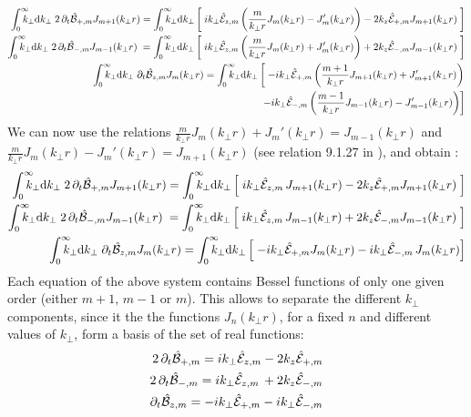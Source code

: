 \begin{align*}
\RInteg{k_\perp } \; 2 \,\partial_t \spectral{B}_{+,m}  J_{m+1}(k_\perp r) =
\RInteg{k_\perp } \left[ \; ik_\perp \spectral{E}_{z,m} \left( \frac{m}{k_\perp r} J_m(k_\perp r) -
    J_m'(k_\perp r) \right) -2 k_z\spectral{E}_{+,m}J_{m+1}(k_\perp r) \;
\right] \\
\RInteg{k_\perp } \; 2\, \partial_t \spectral{B}_{-,m}  J_{m-1}(k_\perp r) \; =
\RInteg{k_\perp } \left[ \;
   ik_\perp \spectral{E}_{z,m} \left( \frac{m}{k_\perp r} J_m(k_\perp r) +
    J_m'(k_\perp r) \right)  + 2k_z\spectral{E}_{-,m}J_{m-1}(k_\perp r) \;
\right] \\
\RInteg{k_\perp }\; \partial_t \spectral{B}_{z,m}  J_{m}(k_\perp r) =
\RInteg{k_\perp } \left[ \; -ik_\perp \spectral{E}_{+,m}\left(\frac{m+1}{k_\perp r}J_{m+1}(k_\perp r) +
    J_{m+1}'(k_\perp r) \right) \right.\\
\qquad \left. - ik_\perp \spectral{E}_{-,m}\left(\frac{m-1}{k_\perp r}J_{m-1}(k_\perp r) -
    J_{m-1}'(k_\perp r) \right) \right] 
\end{align*}
We can now use the relations $\frac{m}{k_\perp r} J_m(k_\perp r) +
    J_m'(k_\perp r) = J_{m-1}(k_\perp r)$ and $\frac{m}{k_\perp r} J_m(k_\perp r) -
    J_m'(k_\perp r) = J_{m+1}(k_\perp r)$ (see relation 9.1.27 in
    \cite{Abramowitz}), and obtain :
\begin{align*}
\RInteg{k_\perp } \; 2 \,\partial_t \spectral{B}_{+,m}  J_{m+1}(k_\perp r) =
\RInteg{k_\perp } \left[ \; ik_\perp \spectral{E}_{z,m}\,
    J_{m+1}(k_\perp r) -2 k_z\spectral{E}_{+,m}J_{m+1}(k_\perp r) \;
\right] \\
\RInteg{k_\perp } \; 2\, \partial_t \spectral{B}_{-,m}  J_{m-1}(k_\perp r) \; =
\RInteg{k_\perp } \left[ \;
   ik_\perp \spectral{E}_{z,m} \,
    J_{m-1}(k_\perp r) + 2k_z\spectral{E}_{-,m}J_{m-1}(k_\perp r) \;
\right] \\
\RInteg{k_\perp }\; \partial_t \spectral{B}_{z,m}  J_{m}(k_\perp r) =
\RInteg{k_\perp } \left[ \; -ik_\perp \spectral{E}_{+,m} J_{m}(k_\perp r) - ik_\perp \spectral{E}_{-,m}\,J_{m}(k_\perp r) \right] 
\end{align*}
Each equation of the above system contains Bessel functions of only one
given order (either $m+1$, $m-1$ or $m$). This allows to separate the
different $k_\perp $ components, since it the the functions $J_n(k_\perp r)$, for a
fixed $n$ and different values of $k_\perp $, form a basis of the set of real functions:
\begin{align*}
2 \,\partial_t \hat{\mathcal{B}}_{+,m} =
ik_\perp \hat{\mathcal{E}}_{z,m} -2 k_z\hat{\mathcal{E}}_{+,m} \\
2\, \partial_t \hat{\mathcal{B}}_{-,m} = ik_\perp \hat{\mathcal{E}}_{z,m} \,
    + 2k_z\hat{\mathcal{E}}_{-,m} \\
 \partial_t \hat{\mathcal{B}}_{z,m} = -ik_\perp \hat{\mathcal{E}}_{+,m}  - ik_\perp \hat{\mathcal{E}}_{-,m}
\end{align*}

